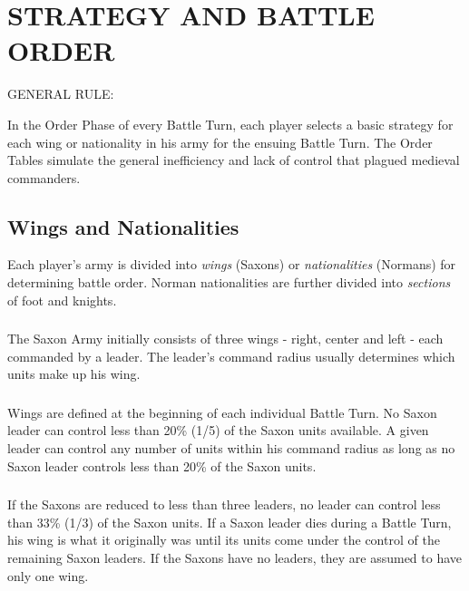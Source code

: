 \section{STRATEGY AND BATTLE ORDER}
\hfill

GENERAL RULE:

In the Order Phase of every Battle Turn, each player selects a basic strategy for each wing or nationality in his army for the ensuing Battle Turn. The Order Tables simulate the general inefficiency and lack of control that plagued medieval commanders.

\subsection{Wings and Nationalities}

Each player's army is divided into \textit{wings} (Saxons) or \textit{nationalities} (Normans) for determining battle order. Norman nationalities are further divided into \textit{sections} of foot and knights.

\subsubsection[Saxon Wings]{}

The Saxon Army initially consists of three wings - right, center and left - each commanded by a leader. The leader's command radius usually determines which units make up his wing.

\subsubsection[Defining Saxon Wings]{}

Wings are defined at the beginning of each individual Battle Turn. No Saxon leader can control less than 20\% (1/5) of the Saxon units available. A given leader can control any number of units within his command radius as long as no Saxon leader controls less than 20\% of the Saxon units.

\subsubsection[Saxon Leader Loss and Wings]{}

If the Saxons are reduced to less than three leaders, no leader can control less than 33\% (1/3) of the Saxon units. If a Saxon leader dies during a Battle Turn, his wing is what it originally was until its units come under the control of the remaining Saxon leaders. If the Saxons have no leaders, they are assumed to have only one wing.

